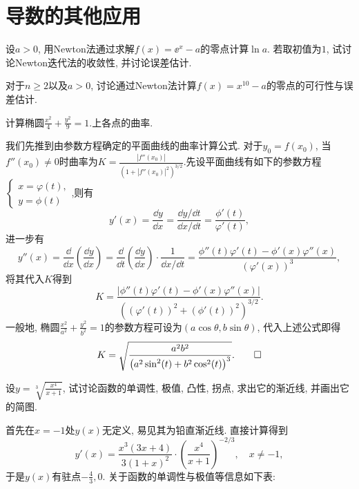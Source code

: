 \section{导数的其他应用}
\begin{quiza}
\woe 设\(a>0\), 用Newton法通过求解\(f(x)=\ee^x-a\)的零点计算\(\ln a\). 若取初值为\(1\), 试讨论Newton迭代法的收敛性, 并讨论误差估计.
\begin{solution}

\end{solution}
\woe 对于\(n\geqslant 2\)以及\(a>0\), 讨论通过Newton法计算\(f(x)=x^{10}-a\)的零点的可行性与误差估计.
\begin{solution}

\end{solution}
\woe 计算椭圆\(\frac{x^2}{4}+\frac{y^2}{9}=1.\)上各点的曲率.
\begin{solution}
我们先推到由参数方程确定的平面曲线的曲率计算公式. 对于\(y_0=f(x_0)\), 当\(f''(x_0)\ne 0\)时曲率为\(K=\frac{\left|f''(x_0)\right|}{\left(1+\left|f''(x_0)\right|^2\right)^{3/2}}\).先设平面曲线有如下的参数方程\(\begin{cases}
x=\varphi(t),\\
y=\phi(t)
\end{cases}\),则有\[y'(x)=\frac{\dd y}{\dd x}=\frac{\dd y/\dd t}{\dd x/\dd t}=\frac{\phi'(t)}{\varphi'(t)},\]进一步有\[y''(x)=\frac{\dd}{\dd x}\left(\frac{\dd y}{\dd x}\right)=\frac{\dd}{\dd t}\left(\frac{\dd y}{\dd x}\right)\cdot\frac{1}{\dd x/\dd t}=\frac{\phi''(t)\varphi'(t)-\phi'(x)\varphi''(x)}{\left(\varphi'(x)\right)^3},\]将其代入\(K\)得到\[K=\frac{\left|\phi''(t)\varphi'(t)-\phi'(x)\varphi''(x)\right|}{\left(\left(\varphi'(t)\right)^2+\left(\phi'(t)\right)^2\right)^{3/2}}.\]一般地, 椭圆\(\frac{x^2}{a^2}+\frac{y^2}{b^2}=1\)的参数方程可设为\(\left(a\cos\theta,b\sin\theta\right)\), 代入上述公式即得\[K=\sqrt{\frac{a^2 b^2}{\left(a^2 \sin ^2(t)+b^2 \cos ^2(t)\right)^3}}.\qedhere\]
\end{solution}
\woe 设\(y=\sqrt[3]{\frac{x^4}{x+1}}\), 试讨论函数的单调性, 极值, 凸性, 拐点, 求出它的渐近线, 并画出它的简图.
\begin{solution}
首先在\(x=-1\)处\(y(x)\)无定义, 易见其为铅直渐近线. 直接计算得到\[y'(x)=\frac{x^3(3x+4)}{3(1+x)^2}\cdot\left(\frac{x^4}{x+1}\right)^{-2/3},\quad x\ne -1,\]于是\(y(x)\)有驻点\(-\frac{4}{3},0\). 关于函数的单调性与极值等信息如下表:
\begin{center}
\begin{tabular}{c|c|c|c|c|c|c|c}

\end{tabular}
\end{center}
\end{solution}
\end{quiza}
